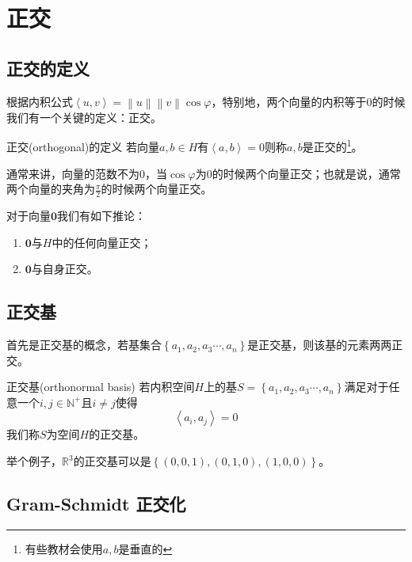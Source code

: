 \section{正交}

\subsection{正交的定义}

根据内积公式$\left \langle u,v \right \rangle =\left \| u \right \| \left \| v \right \| \cos \varphi$，特别地，两个向量的内积等于0的时候我们有一个关键的定义：正交。

\begin{definition}{正交(orthogonal)的定义}
	若向量$a,b \in H$有$\left \langle a,b \right \rangle = 0$则称$a,b$是正交的\footnote{有些教材会使用$a,b$是垂直的}。
\end{definition}

通常来讲，向量的范数不为0，当$\cos \varphi$为0的时候两个向量正交；也就是说，通常两个向量的夹角为$\displaystyle \frac{\pi}{2}$的时候两个向量正交。

对于向量$\boldsymbol{0}$我们有如下推论：

\begin{corollary}
	\begin{enumerate}
		\item $\boldsymbol{0}$与$H$中的任何向量正交；
		\item $\boldsymbol{0}$与自身正交。
	\end{enumerate}
\end{corollary}

\subsection{正交基}

首先是正交基的概念，若基集合$\left\{ a_1,a_2,a_3\cdots,a_n \right\}$是正交基，则该基的元素两两正交。

\begin{definition}{正交基(orthonormal basis)}
	若内积空间$H$上的基$S=\left\{ a_1,a_2,a_3\cdots,a_n \right\}$满足对于任意一个$i,j \in \mathbb{N}^+$且$i\neq j$使得$$\left \langle a_i,a_j \right \rangle =0$$我们称$S$为空间$H$的正交基。
\end{definition}

举个例子，$\mathbb{R}^3$的正交基可以是$\left\{ (0,0,1),(0,1,0),(1,0,0) \right\}$。

\subsection{Gram-Schmidt 正交化}

